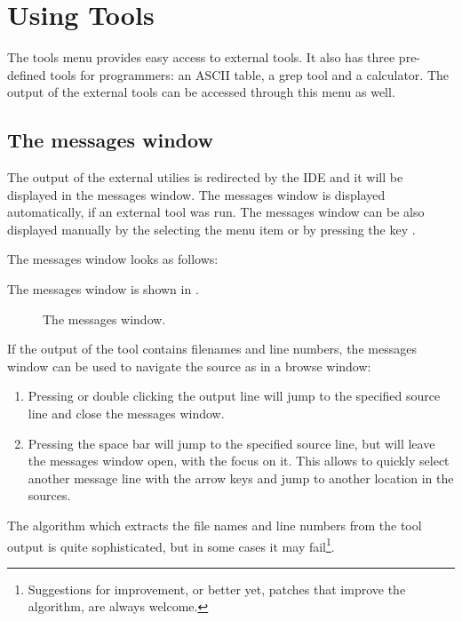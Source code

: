 \section{Using Tools}
\label{se:toolsmenu}
The tools menu provides easy access to external tools. It also has
three pre-defined tools for programmers: an ASCII table,  a grep tool
and a calculator. The output of the external tools can be accessed through
this menu as well.

%
%
\subsection{The messages window}
\label{se:toolsmessages}
The output of the external utilies is redirected by the IDE and it
will be displayed in the messages window. The messages window is
displayed automatically, if an external tool was run. The
messages window can be also displayed manually by the selecting the
menu item  or by pressing the key .

\begin{htmlonly}
The messages window looks as follows:
\end{htmlonly}
\begin{latexonly}
The messages window is shown in .
\begin{figure}[ht]
\caption{The messages window.}\label{fig:messages}
\ifpdf
{}
\else
{}
\fi
\end{figure}
\end{latexonly}
If the output of the tool contains filenames and line numbers,
the messages window can be used to navigate the source as in a browse
window:
\begin{enumerate}
\item Pressing  or double clicking the output line will jump
to the specified source line and close the messages window.
\item Pressing the space bar will jump to the specified source line, but
will leave the messages window open, with the focus on it. This allows to
quickly select another message line with the arrow keys and jump to 
another location in the sources.
\end{enumerate}
The algorithm which extracts the file names and line numbers from
the tool output is quite sophisticated, but in some cases it may
fail\footnote{Suggestions for improvement, or better yet, patches
that improve the algorithm, are always welcome.}.
%
%
